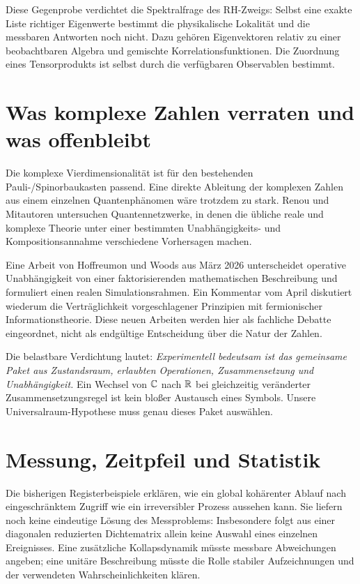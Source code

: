 Diese Gegenprobe verdichtet die Spektralfrage des RH-Zweigs: Selbst eine exakte Liste richtiger Eigenwerte bestimmt die physikalische Lokalität und die messbaren Antworten noch nicht. Dazu gehören Eigenvektoren relativ zu einer beobachtbaren Algebra und gemischte Korrelationsfunktionen. Die Zuordnung eines Tensorprodukts ist selbst durch die verfügbaren Observablen bestimmt. 

\section{Was komplexe Zahlen verraten und was offenbleibt}
Die komplexe Vierdimensionalität ist für den bestehenden Pauli-/Spinorbaukasten passend. Eine direkte Ableitung der komplexen Zahlen aus einem einzelnen Quantenphänomen wäre trotzdem zu stark. Renou und Mitautoren untersuchen Quantennetzwerke, in denen die übliche reale und komplexe Theorie unter einer bestimmten Unabhängigkeits- und Kompositionsannahme verschiedene Vorhersagen machen. 

Eine Arbeit von Hoffreumon und Woods aus März 2026 unterscheidet operative Unabhängigkeit von einer faktorisierenden mathematischen Beschreibung und formuliert einen realen Simulationsrahmen. Ein Kommentar vom April diskutiert wiederum die Verträglichkeit vorgeschlagener Prinzipien mit fermionischer Informationstheorie. Diese neuen Arbeiten werden hier als fachliche Debatte eingeordnet, nicht als endgültige Entscheidung über die Natur der Zahlen. 

Die belastbare Verdichtung lautet: \emph{Experimentell bedeutsam ist das gemeinsame Paket aus Zustandsraum, erlaubten Operationen, Zusammensetzung und Unabhängigkeit.} Ein Wechsel von $\mathbb C$ nach $\mathbb R$ bei gleichzeitig veränderter Zusammensetzungsregel ist kein bloßer Austausch eines Symbols. Unsere Universalraum-Hypothese muss genau dieses Paket auswählen.

\section{Messung, Zeitpfeil und Statistik}
Die bisherigen Registerbeispiele erklären, wie ein global kohärenter Ablauf nach eingeschränktem Zugriff wie ein irreversibler Prozess aussehen kann. Sie liefern noch keine eindeutige Lösung des Messproblems: Insbesondere folgt aus einer diagonalen reduzierten Dichtematrix allein keine Auswahl eines einzelnen Ereignisses. Eine zusätzliche Kollapsdynamik müsste messbare Abweichungen angeben; eine unitäre Beschreibung müsste die Rolle stabiler Aufzeichnungen und der verwendeten Wahrscheinlichkeiten klären.

